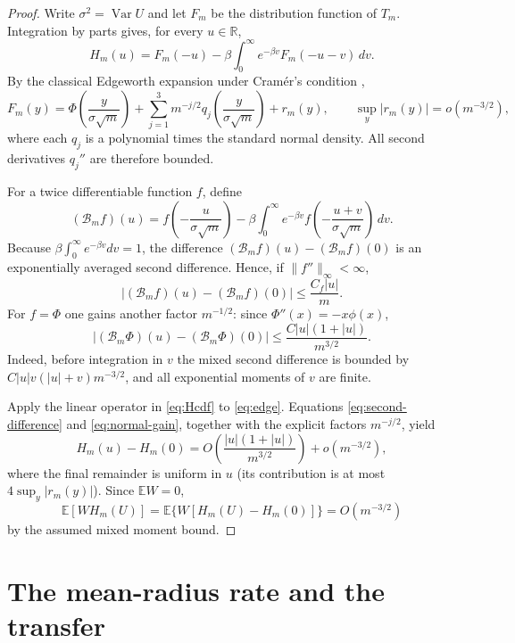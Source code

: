 \documentclass[11pt]{article}
\newcommand{\E}{\mathbb E}
\newcommand{\Var}{\operatorname{Var}}
\begin{document}
\begin{proof}
Write $\sigma^2=\Var U$ and let $F_m$ be the distribution function of
$T_m$.  Integration by parts gives, for every $u\in\mathbb R$,
\begin{equation}\label{eq:Hcdf}
 H_m(u)=F_m(-u)-\beta\int_0^\infty e^{-\beta v}F_m(-u-v)\,dv.
\end{equation}
By the classical Edgeworth expansion under Cram\'er's condition
\cite[Chapter 2]{BR},
\begin{equation}\label{eq:edge}
 F_m(y)=\Phi\!\left(\frac{y}{\sigma\sqrt m}\right)
 +\sum_{j=1}^3m^{-j/2}q_j\!\left(\frac{y}{\sigma\sqrt m}\right)
 +r_m(y),
 \qquad \sup_y|r_m(y)|=o(m^{-3/2}),
\end{equation}
where each $q_j$ is a polynomial times the standard normal density.  All
second derivatives $q_j''$ are therefore bounded.

For a twice differentiable function $f$, define
\[
 (\mathcal B_m f)(u)=f\!\left(-\frac{u}{\sigma\sqrt m}\right)
 -\beta\int_0^\infty e^{-\beta v}
 f\!\left(-\frac{u+v}{\sigma\sqrt m}\right)\,dv.
\]
Because $\beta\int_0^\infty e^{-\beta v}dv=1$, the difference
$(\mathcal B_m f)(u)-(\mathcal B_m f)(0)$ is an exponentially averaged
second difference.  Hence, if $\|f''\|_\infty<\infty$,
\begin{equation}\label{eq:second-difference}
 |(\mathcal B_m f)(u)-(\mathcal B_m f)(0)|
 \le \frac{C_f|u|}{m}.
\end{equation}
For $f=\Phi$ one gains another factor $m^{-1/2}$: since
$\Phi''(x)=-x\phi(x)$,
\begin{equation}\label{eq:normal-gain}
 |(\mathcal B_m\Phi)(u)-(\mathcal B_m\Phi)(0)|
 \le \frac{C|u|(1+|u|)}{m^{3/2}}.
\end{equation}
Indeed, before integration in $v$ the mixed second difference is bounded by
$C|u|v(|u|+v)m^{-3/2}$, and all exponential moments of $v$ are finite.

Apply the linear operator in \eqref{eq:Hcdf} to \eqref{eq:edge}.  Equations
\eqref{eq:second-difference} and \eqref{eq:normal-gain}, together with the
explicit factors $m^{-j/2}$, yield
\[
 H_m(u)-H_m(0)
 =O\!\left(\frac{|u|(1+|u|)}{m^{3/2}}\right)
   +o(m^{-3/2}),
\]
where the final remainder is uniform in $u$ (its contribution is at most
$4\sup_y|r_m(y)|$).  Since $\E W=0$,
\[
 \E[W H_m(U)]=\E\{W[H_m(U)-H_m(0)]\}=O(m^{-3/2})
\]
by the assumed mixed moment bound.
\end{proof}

\section{The mean-radius rate and the transfer}
\end{document}
